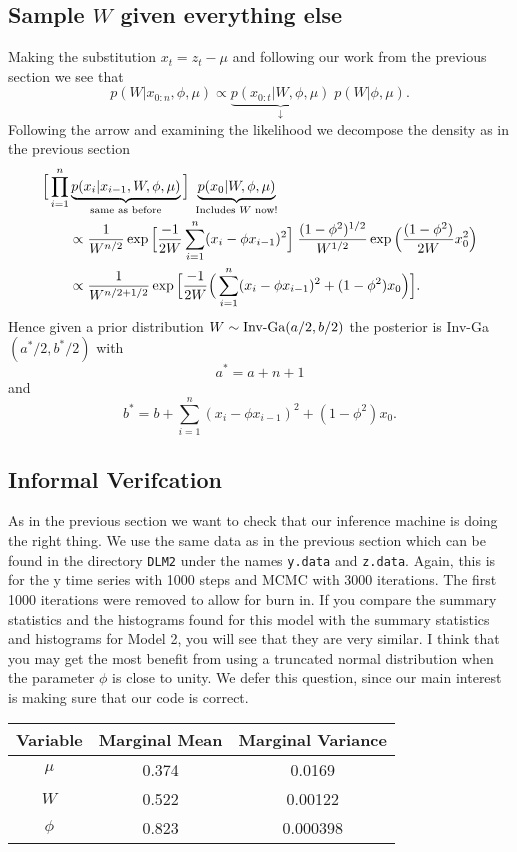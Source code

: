 \documentclass{article}
\begin{document}
\subsection{Sample $W$ given everything else}

Making the substitution $x_t = z_t - \mu$ and following our work from the previous section we see that
\[
p(W | x_{0:n}, \phi, \mu) 
\propto 
\underbrace{p(x_{0:t} | W, \phi, \mu)}_{\downarrow} \; p(W | \phi, \mu).
\]
Following the arrow and examining the likelihood we decompose the density as in the previous section
\begin{align*}
\Big[ \prod_{i=1}^n &
\underbrace{p(x_i | x_{i-1}, W, \phi, \mu)}_{\textmd{same as before}} \Big]
\; \underbrace{p(x_0 | W, \phi, \mu)}_{\textmd{Includes $W$ now!}}
\\
& \propto 
\frac{1}{W^{n/2}} \exp \Big[ \frac{-1}{2W} \sum_{i=1}^n (x_i - \phi x_{i-1} )^2 \Big] \; \frac{(1-\phi^2)^{1/2}}{W^{1/2}} \exp \Big(\frac{(1-\phi^2)}{2 W} x_0^2 \Big) \\
& \propto \frac{1}{W^{n/2+1/2}} \exp \Big[ \frac{-1}{2W} \Big( \sum_{i=1}^n (x_i - \phi x_{i-1})^2 + (1-\phi^2) x_0 \Big) \Big].
\end{align*}
Hence given a prior distribution $W \sim \textmd{Inv-Ga}(a/2,b/2)$ the posterior is Inv-Ga$(a^*/2, b^*/2)$ with 
\[
a^* = a + n + 1
\]
and 
\[
b^* = b + \sum_{i=1}^n (x_i - \phi x_{i-1})^2 + (1-\phi^2) x_0.
\]

\subsection{Informal Verifcation}

As in the previous section we want to check that our inference machine is doing the right thing.  We use the same data as in the previous section which can be found in the directory \texttt{DLM2} under the names \texttt{y.data} and \texttt{z.data}.  Again, this is for the y time series with 1000 steps and MCMC with 3000 iterations.  The first 1000 iterations were removed to allow for burn in.  If you compare the summary statistics and the histograms found for this model with the summary statistics and histograms for Model 2, you will see that they are very similar.  I think that you may get the most benefit from using a truncated normal distribution when the parameter $\phi$ is close to unity.  We defer this question, since our main interest is making sure that our code is correct.

\begin{center}
\begin{tabular}{c | c | c}
Variable & Marginal Mean & Marginal Variance \\
\hline
$\mu$ & 0.374 & 0.0169 \\
$W$ & 0.522 & 0.00122 \\
$\phi$ & 0.823 & 0.000398 \\
\end{tabular}
\end{center}
\end{document}
